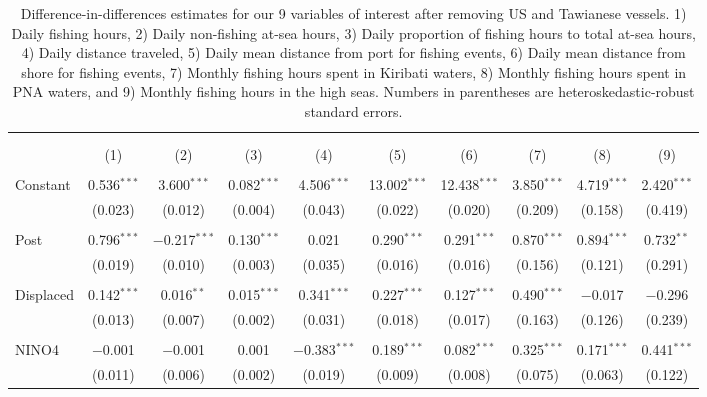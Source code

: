 \documentclass[12pt]{article}
\begin{document}
\begin{landscape}
\begin{table}[H] \centering 
  \caption{\label{tab:DID_without_USA_TWN}Difference-in-differences estimates for our 9 variables of interest after removing US and Tawianese vessels. 1) Daily fishing hours, 2) Daily non-fishing at-sea hours, 3) Daily proportion of fishing hours to total at-sea hours, 4) Daily distance traveled, 5) Daily mean distance from port for fishing events, 6) Daily mean distance from shore for fishing events, 7) Monthly fishing hours spent in Kiribati waters, 8) Monthly fishing hours spent in PNA waters, and 9) Monthly fishing hours in the high seas. Numbers in parentheses are heteroskedastic-robust standard errors.} 
  \label{} 
\footnotesize 
\begin{tabular}{@{\extracolsep{1pt}}lccccccccc} 
\\[-1.8ex]\hline 
\hline \\[-1.8ex] 
\\[-1.8ex] & (1) & (2) & (3) & (4) & (5) & (6) & (7) & (8) & (9)\\ 
\hline \\[-1.8ex] 
 Constant & 0.536$^{***}$ & 3.600$^{***}$ & 0.082$^{***}$ & 4.506$^{***}$ & 13.002$^{***}$ & 12.438$^{***}$ & 3.850$^{***}$ & 4.719$^{***}$ & 2.420$^{***}$ \\ 
  & (0.023) & (0.012) & (0.004) & (0.043) & (0.022) & (0.020) & (0.209) & (0.158) & (0.419) \\ 
  & & & & & & & & & \\ 
 Post & 0.796$^{***}$ & $-$0.217$^{***}$ & 0.130$^{***}$ & 0.021 & 0.290$^{***}$ & 0.291$^{***}$ & 0.870$^{***}$ & 0.894$^{***}$ & 0.732$^{**}$ \\ 
  & (0.019) & (0.010) & (0.003) & (0.035) & (0.016) & (0.016) & (0.156) & (0.121) & (0.291) \\ 
  & & & & & & & & & \\ 
 Displaced & 0.142$^{***}$ & 0.016$^{**}$ & 0.015$^{***}$ & 0.341$^{***}$ & 0.227$^{***}$ & 0.127$^{***}$ & 0.490$^{***}$ & $-$0.017 & $-$0.296 \\ 
  & (0.013) & (0.007) & (0.002) & (0.031) & (0.018) & (0.017) & (0.163) & (0.126) & (0.239) \\ 
  & & & & & & & & & \\ 
 NINO4 & $-$0.001 & $-$0.001 & 0.001 & $-$0.383$^{***}$ & 0.189$^{***}$ & 0.082$^{***}$ & 0.325$^{***}$ & 0.171$^{***}$ & 0.441$^{***}$ \\ 
  & (0.011) & (0.006) & (0.002) & (0.019) & (0.009) & (0.008) & (0.075) & (0.063) & (0.122) \\ 

\end{tabular}
\end{table}
\end{landscape}
\end{document}
